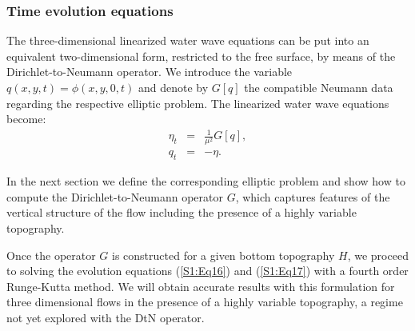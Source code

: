 \subsubsection{Time evolution equations}
The three-dimensional linearized water wave equations can be put into an equivalent two-dimensional form,
restricted to the free surface,  by means of the Dirichlet-to-Neumann operator. We introduce the variable $q(x,y,t) = \phi(x,y,0,t)$ 
and denote by $G[q]$ the compatible Neumann data 
regarding the respective elliptic problem. The linearized water wave equations become:
\begin{eqnarray}
\eta_t &=& \tfrac{1}{\mu^2}G[q],\label{S1:Eq16}\\
q_t &=& -\eta.\label{S1:Eq17}
\end{eqnarray}

In the next section we define the corresponding elliptic problem and show how to compute the Dirichlet-to-Neumann operator $G$,  
which captures features of the vertical structure of the flow including the presence of  a highly
variable topography.

Once the operator $G$ is constructed for a given bottom topography $H$, we proceed to solving the evolution equations (\ref{S1:Eq16}) and (\ref{S1:Eq17}) with a fourth order Runge-Kutta method. We will obtain accurate results with this formulation for 
three dimensional flows  in the presence of 
a highly variable topography, a regime not yet explored with the DtN operator.